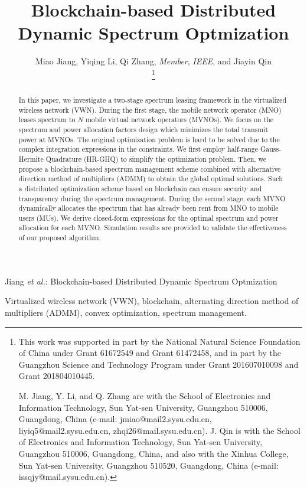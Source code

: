\documentclass[journal]{IEEEtran}
\begin{document}
	
\title{Blockchain-based Distributed Dynamic Spectrum Optmization}
	
\author{Miao Jiang, Yiqing Li, Qi Zhang, \emph{Member}, \emph{IEEE}, and Jiayin Qin

\thanks{This work was supported in part by the National Natural Science Foundation of China under Grant 61672549 and Grant 61472458, and in part by the Guangzhou Science and Technology Program under Grant 201607010098 and Grant 201804010445.

M. Jiang, Y. Li, and Q. Zhang are with the School of Electronics and Information Technology, Sun Yat-sen University, Guangzhou 510006, Guangdong, China (e-mail: jmiao@mail2.sysu.edu.cn, liyiq5@mail2.sysu.edu.cn, zhqi26@mail.sysu.edu.cn). J. Qin is with the School of Electronics and
Information Technology, Sun Yat-sen University, Guangzhou 510006, Guangdong,  China, and also with the Xinhua College, Sun Yat-sen University, Guangzhou 510520, Guangdong, China (e-mail: issqjy@mail.sysu.edu.cn). }
}%
	
	
{Jiang \MakeLowercase{\textit{et al.}}: Blockchain-based Distributed Dynamic Spectrum Optmization}
	
\maketitle
\begin{abstract}
In this paper, we investigate a two-stage spectrum leasing framework in the virtualized wireless network (VWN). During the first stage, the mobile network operator (MNO) leases spectrum to $N$ mobile virtual network operators (MVNOs). We focus on the spectrum and power allocation factors design which minimizes the total transmit power at MVNOs. The original optimization problem is hard to be solved due to the complex integration expressions in the constraints. We first employ half-range Gauss-Hermite Quadrature (HR-GHQ) to simplify the optimization problem. Then, we propose a blockchain-based spectrum management scheme combined with alternative direction method of multipliers (ADMM) to obtain the global optimal solutions. Such a distributed optimization scheme based on blockchain can ensure security and transparency during the spectrum management. During the second stage, each MVNO dynamically allocates the spectrum that has already been rent from MNO to mobile users (MUs). We derive closed-form expressions for the optimal spectrum and power allocation for each MVNO. Simulation results are provided to validate the effectiveness of our proposed algorithm.
\end{abstract}
\begin{IEEEkeywords} Virtualized wireless network (VWN), blockchain, alternating direction method of multipliers (ADMM), convex optimization, spectrum management.
\end{IEEEkeywords}
\IEEEpeerreviewmaketitle
	
\end{document}
